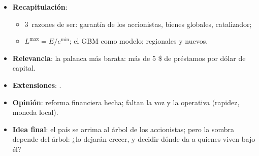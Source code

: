\documentclass{article}
\begin{document}
\begin{columnas}
\begin{itemize}
\item \textbf{Recapitulación}:
  \begin{itemize}
  \item 3~razones de ser: garantía de los accionistas, bienes globales, catalizador;
  \item $L^{\max}=E/e^{\min}$; el GBM como modelo; regionales y nuevos.
  \end{itemize}
\item \textbf{Relevancia}: la palanca más barata: más de 5 \$ de préstamos por dólar de capital.
\item \textbf{Extensiones}:      .
\item \textbf{Opinión}: reforma financiera hecha; faltan la voz y la operativa (rapidez, moneda local).
\item \textbf{Idea final}: el país se arrima al árbol de los accionistas; pero la sombra depende del árbol: ¿lo dejarán crecer, y decidir dónde da a quienes viven bajo él?
\end{itemize}


\end{columnas}
\end{document}
